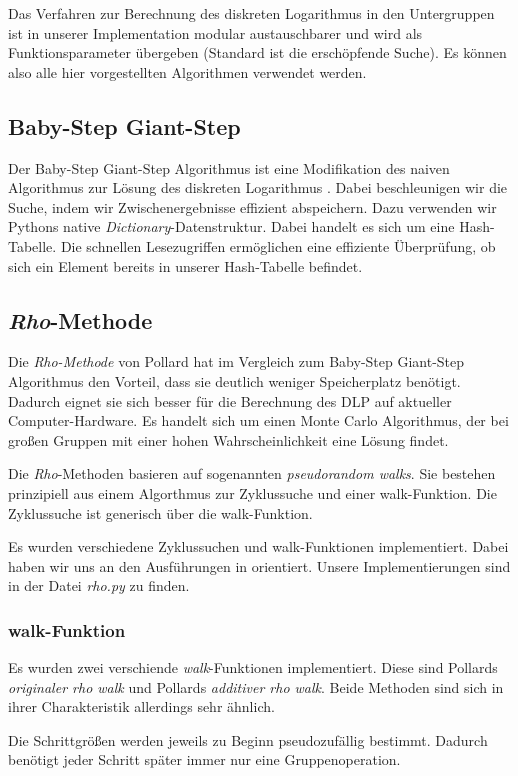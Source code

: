 \documentclass{scrartcl}
\begin{document}
Das Verfahren zur Berechnung des diskreten Logarithmus in den Untergruppen ist in unserer Implementation modular austauschbarer und wird als Funktionsparameter übergeben (Standard ist die erschöpfende Suche). Es können also alle hier vorgestellten Algorithmen verwendet werden.
\subsection{Baby-Step Giant-Step}
\label{sec:baby_step_giant_step}
Der Baby-Step Giant-Step Algorithmus ist eine Modifikation des naiven Algorithmus zur Lösung des diskreten Logarithmus  \cite{Galbraith2012}. Dabei beschleunigen wir die Suche, indem wir Zwischenergebnisse effizient abspeichern. Dazu verwenden wir Pythons native \emph{Dictionary}-Datenstruktur. Dabei handelt es sich um eine Hash-Tabelle. Die schnellen Lesezugriffen ermöglichen eine effiziente Überprüfung, ob sich ein Element bereits in unserer Hash-Tabelle befindet.
\subsection{\emph{Rho}-Methode}
\label{sec:rho}
Die \emph{Rho-Methode} von Pollard hat im Vergleich zum Baby-Step Giant-Step Algorithmus den Vorteil,
dass sie deutlich weniger Speicherplatz benötigt.
Dadurch eignet sie sich besser für die Berechnung des DLP auf aktueller Computer-Hardware. 
Es handelt sich um einen Monte Carlo Algorithmus, der bei großen Gruppen mit einer hohen Wahrscheinlichkeit eine Lösung findet.

Die \emph{Rho}-Methoden basieren auf sogenannten \emph{pseudorandom walks}.
Sie bestehen prinzipiell aus einem Algorthmus zur Zyklussuche
und einer walk-Funktion.
Die Zyklussuche ist generisch über die walk-Funktion.

Es wurden verschiedene Zyklussuchen und walk-Funktionen
implementiert.
Dabei haben wir uns an den Ausführungen in \cite{Galbraith2012}
orientiert.
Unsere Implementierungen sind in der Datei \emph{rho.py} zu finden.

\subsubsection{walk-Funktion}
\label{sec:walk_funktion}
Es wurden zwei verschiende \emph{walk}-Funktionen implementiert.
Diese sind Pollards \emph{originaler rho walk} und Pollards \emph{additiver rho walk}.
Beide Methoden sind sich in ihrer Charakteristik allerdings sehr ähnlich.

Die Schrittgrößen werden jeweils zu Beginn pseudozufällig bestimmt.
Dadurch benötigt jeder Schritt später immer nur eine Gruppenoperation.
\end{document}
